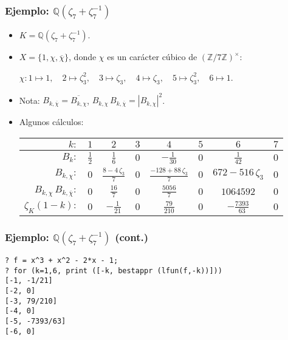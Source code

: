 \documentclass[handout]{beamer}
\newcommand{\ZZ}{\mathbb{Z}}
\newcommand{\QQ}{\mathbb{Q}}
\begin{document}
\begin{frame}
  \frametitle{Ejemplo: $\QQ (\zeta_7 + \zeta_7^{-1})$}

  \begin{itemize}
  \item<1-> $K = \QQ (\zeta_7 + \zeta_7^{-1})$.

  \item<2-> $X = \{ 1, \chi, \overline{\chi} \}$, donde $\chi$ es un carácter
    cúbico de $(\ZZ/7\ZZ)^\times$:

    $\chi\colon 1\mapsto 1, \quad
    2 \mapsto \zeta_3^2, \quad
    3 \mapsto \zeta_3, \quad
    4 \mapsto \zeta_3, \quad
    5 \mapsto \zeta_3^2, \quad
    6 \mapsto 1$.

  \item<3-> Nota: $B_{k,\overline{\chi}} = \overline{B_{k,\chi}}$,
    $B_{k,\chi}\,B_{k,\overline{\chi}} = |B_{k,\chi}|^2$.

  \item<4-> Algunos cálculos:

    \begin{center}\small
    \renewcommand{\arraystretch}{1.5}
    \begin{tabular}{rccccccc}
      \hline
      $k\colon$ & $1$ & $2$ & $3$ & $4$ & $5$ & $6$ & $7$ \\
      \hline
      $B_k\colon$ & $\frac{1}{2}$ & $\frac{1}{6}$ & $0$ & $-\frac{1}{30}$ & $0$ & $\frac{1}{42}$ & $0$ \\
      \hline
      $B_{k,\chi}\colon$ & $0$ & $\frac{8-4\,\zeta_3}{7}$ & $0$ & $\frac{-128 + 88\,\zeta_3}{7}$ & $0$ & $672 - 516\,\zeta_3$ & $0$ \\
      \hline
      $B_{k,\chi}\,B_{k,\overline{\chi}}\colon$ & $0$ & $\frac{16}{7}$ & $0$ & $\frac{5056}{7}$ & $0$ & $1064592$ & $0$ \\
      \hline
      $\zeta_K (1-k)\colon$ & $0$ & $-\frac{1}{21}$ & $0$ & $\frac{79}{210}$ & $0$ & $-\frac{7393}{63}$ & $0$ \\
      \hline
    \end{tabular}
  \end{center}
  \end{itemize}
\end{frame}


\begin{frame}[fragile]
  \frametitle{Ejemplo: $\QQ (\zeta_7 + \zeta_7^{-1})$ (cont.)}

  \begin{shaded}\small
\begin{verbatim}
? f = x^3 + x^2 - 2*x - 1;
? for (k=1,6, print ([-k, bestappr (lfun(f,-k))]))
[-1, -1/21]
[-2, 0]
[-3, 79/210]
[-4, 0]
[-5, -7393/63]
[-6, 0]
\end{verbatim}
\end{shaded}
\end{frame}
\end{document}
